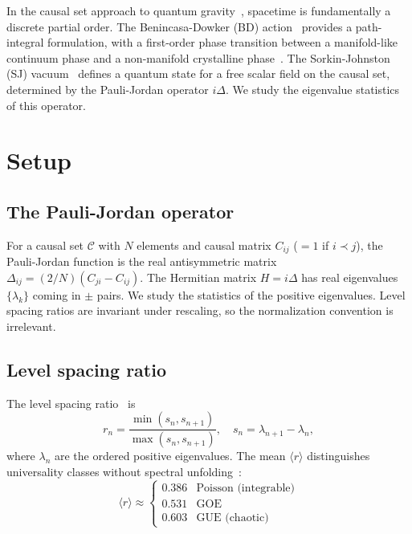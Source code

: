\documentclass[aps,prd,twocolumn,superscriptaddress,nofootinbib]{revtex4-2}
\begin{document}
In the causal set approach to quantum gravity~\cite{bombelli1987,surya2019}, spacetime is fundamentally a discrete partial order. The Benincasa-Dowker (BD) action~\cite{benincasa2010} provides a path-integral formulation, with a first-order phase transition between a manifold-like continuum phase and a non-manifold crystalline phase~\cite{surya2012,glaser2018}. The Sorkin-Johnston (SJ) vacuum~\cite{johnston2009,sorkin2012} defines a quantum state for a free scalar field on the causal set, determined by the Pauli-Jordan operator $i\Delta$. We study the eigenvalue statistics of this operator.

\section{Setup}

\subsection{The Pauli-Jordan operator}

For a causal set $\mathcal{C}$ with $N$ elements and causal matrix $C_{ij}$ ($= 1$ if $i \prec j$), the Pauli-Jordan function is the real antisymmetric matrix $\Delta_{ij} = (2/N)(C_{ji} - C_{ij})$. The Hermitian matrix $H = i\Delta$ has real eigenvalues $\{\lambda_k\}$ coming in $\pm$ pairs. We study the statistics of the positive eigenvalues. Level spacing ratios are invariant under rescaling, so the normalization convention is irrelevant.

\subsection{Level spacing ratio}

The level spacing ratio~\cite{oganesyan2007} is
\begin{equation}
r_n = \frac{\min(s_n, s_{n+1})}{\max(s_n, s_{n+1})}, \quad s_n = \lambda_{n+1} - \lambda_n,
\end{equation}
where $\lambda_n$ are the ordered positive eigenvalues. The mean $\langle r \rangle$ distinguishes universality classes without spectral unfolding~\cite{atas2013}:
\begin{equation}
\langle r \rangle \approx \begin{cases} 0.386 & \text{Poisson (integrable)} \\ 0.531 & \text{GOE} \\ 0.603 & \text{GUE (chaotic)} \end{cases}
\end{equation}
\end{document}
